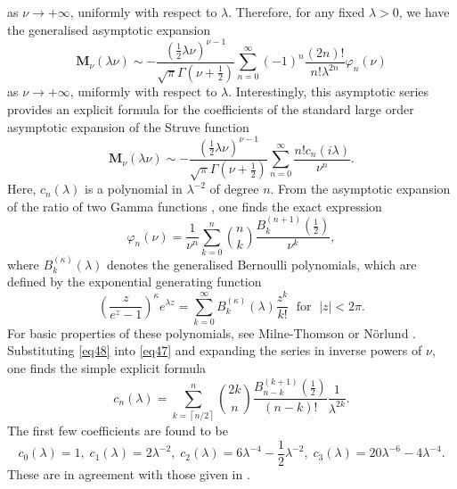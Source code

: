 \documentclass[a4paper,twoside,10pt]{amsart}
\numberwithin{equation}{section}
\begin{document}
as $\nu \to +\infty$, uniformly with respect to $\lambda$. Therefore, for any fixed $\lambda>0$, we have the generalised asymptotic expansion
\begin{equation}\label{eq47}
\mathbf{M}_\nu  \left( {\lambda \nu } \right) \sim  - \frac{{\left( {\frac{1}{2}\lambda \nu } \right)^{\nu  - 1} }}{{\sqrt \pi  \Gamma \left( {\nu  + \frac{1}{2}} \right)}}\sum\limits_{n = 0}^\infty  {\left( { - 1} \right)^n \frac{\left(2n\right)!}{n!  \lambda ^{2n} }\varphi _n \left( \nu  \right)} 
\end{equation}
as $\nu \to +\infty$, uniformly with respect to $\lambda$. Interestingly, this asymptotic series provides an explicit formula for the coefficients of the standard large order asymptotic expansion of the Struve function \cite[11.6.E7]{NIST}
\begin{equation}\label{eq49}
\mathbf{M}_\nu  \left( {\lambda \nu } \right) \sim  - \frac{{\left( {\frac{1}{2}\lambda \nu } \right)^{\nu  - 1} }}{{\sqrt \pi  \Gamma \left( {\nu  + \frac{1}{2}} \right)}} \sum\limits_{n = 0}^\infty  {\frac{{n!c_n \left( {i\lambda } \right)}}{{\nu ^n }}} .
\end{equation}
Here, $c_n\left(\lambda\right)$ is a polynomial in $\lambda^{-2}$ of degree $n$. From the asymptotic expansion of the ratio of two Gamma functions \cite[5.11.E13]{NIST}, one finds the exact expression
\begin{equation}\label{eq48}
\varphi _n \left( \nu  \right) = \frac{1}{{\nu ^n }}\sum\limits_{k = 0}^n {\binom{n}{k}\frac{{B_k^{\left( {n + 1} \right)} \left( {\frac{1}{2}} \right)}}{{\nu ^k }}}, 
\end{equation}
where $B_k^{\left( \kappa  \right)} \left(\lambda\right)$ denotes the generalised Bernoulli polynomials, which are defined by the exponential generating function
\[
\left( \frac{z}{e^z  - 1} \right)^\kappa  e^{\lambda z}  = \sum\limits_{k = 0}^\infty  {B_k^{\left( \kappa  \right)} \left(\lambda\right)\frac{z^k}{k!}} \; \text{ for } \; \left|z\right| < 2\pi.
\]
For basic properties of these polynomials, see Milne-Thomson \cite{Milne-Thomson} or N\"{o}rlund \cite{Norlund}. Substituting \eqref{eq48} into \eqref{eq47} and expanding the series in inverse powers of $\nu$, one finds the simple explicit formula
\[
c_n \left( \lambda  \right) = \sum\limits_{k = \left\lceil {n/2} \right\rceil }^n {\binom{2k}{n}\frac{{B_{n - k}^{\left( {k + 1} \right)} \left( {\frac{1}{2}} \right)}}{{\left( {n - k} \right)!}}\frac{1}{\lambda ^{2k}}} .
\]
The first few coefficients are found to be
\[
c_0 \left( \lambda  \right) = 1,\; c_1 \left( \lambda  \right) = 2\lambda ^{ - 2} ,\; c_2 \left( \lambda  \right) = 6\lambda ^{ - 4}  - \frac{1}{2}\lambda ^{ - 2} ,\; c_3 \left( \lambda  \right) = 20\lambda ^{ - 6}  - 4\lambda ^{ - 4} .
\]
These are in agreement with those given in \cite[11.6.E8]{NIST}.
\end{document}
